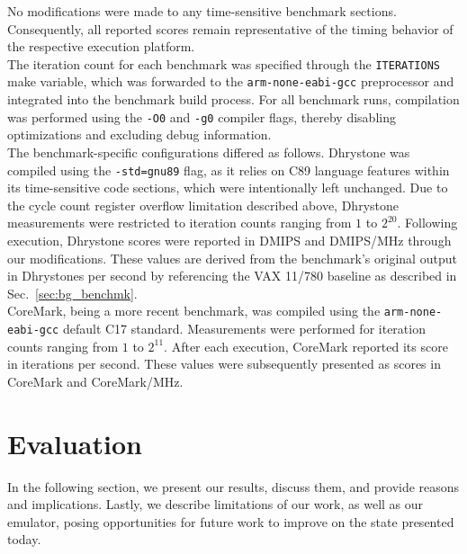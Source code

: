 \documentclass[english]{tudscrartcl}
\begin{document}
			No modifications were made to any time-sensitive benchmark sections.
			Consequently, all reported scores remain representative of the timing behavior of the respective execution platform.
			\\
			The iteration count for each benchmark was specified through the \texttt{ITERATIONS} make variable, which was forwarded to the \texttt{arm-none-eabi-gcc} preprocessor and integrated into the benchmark build process.
			For all benchmark runs, compilation was performed using the \texttt{-O0} and \texttt{-g0} compiler flags, thereby disabling optimizations and excluding debug information.
			\\
			The benchmark-specific configurations differed as follows.
			Dhrystone was compiled using the \texttt{-std=gnu89} flag, as it relies on C89 language features within its time-sensitive code sections, which were intentionally left unchanged.
			Due to the cycle count register overflow limitation described above, Dhrystone measurements were restricted to iteration counts ranging from $1$ to $2^{20}$.
			Following execution, Dhrystone scores were reported in DMIPS and DMIPS/MHz through our modifications.
			These values are derived from the benchmark's original output in Dhrystones per second by referencing the VAX 11/780 baseline as described in Sec.~\ref{sec:bg_benchmk}.
			\\
			CoreMark, being a more recent benchmark, was compiled using the \texttt{arm-none-eabi-gcc} default C17 standard.
			Measurements were performed for iteration counts ranging from $1$ to $2^{11}$.
			After each execution, CoreMark reported its score in iterations per second.
			These values were subsequently presented as scores in CoreMark and CoreMark/MHz.
			\\
	\section{Evaluation}
		\label{sec:eval}
		In the following section, we present our results, discuss them, and provide reasons and implications.
		Lastly, we describe limitations of our work, as well as our emulator, posing opportunities for future work to improve on the state presented today.
		\\
\end{document}
